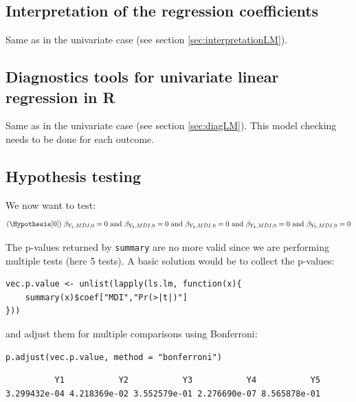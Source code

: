 \documentclass{article}
\newcommand\Rlogo{\textbf{\textsf{R}}}
\begin{document}
\subsection{Interpretation of the regression coefficients}
\label{sec:org3746056}

Same as in the univariate case (see section \ref{sec:interpretationLM}).

\subsection{Diagnostics tools for univariate linear regression in \Rlogo{}}
\label{sec:org3819252}

Same as in the univariate case (see section \ref{sec:diagLM}). This model
checking needs to be done for each outcome.

\subsection{Hypothesis testing}
\label{sec:org22df8a0}

We now want to test:
\begin{align*}
(\Hypothesis[0]) \; \beta_{Y_1, MDI, 0} = 0
 \text{ and } \beta_{Y_2, MDI, 0} = 0
 \text{ and } \beta_{Y_3, MDI, 0} = 0
 \text{ and } \beta_{Y_4, MDI, 0} = 0
 \text{ and } \beta_{Y_5, MDI, 0} = 0
\end{align*}

The p-values returned by \texttt{summary} are no more valid since we are
performing multiple tests (here 5 tests). A basic solution would be to
collect the p-values:
\lstset{language=r,label= ,caption= ,captionpos=b,numbers=none}
\begin{lstlisting}
vec.p.value <- unlist(lapply(ls.lm, function(x){
	summary(x)$coef["MDI","Pr(>|t|)"]
}))
\end{lstlisting}

\clearpage

and adjust them for multiple comparisons using Bonferroni:
\lstset{language=r,label= ,caption= ,captionpos=b,numbers=none}
\begin{lstlisting}
p.adjust(vec.p.value, method = "bonferroni")
\end{lstlisting}

\begin{verbatim}
          Y1           Y2           Y3           Y4           Y5 
3.299432e-04 4.218369e-02 3.552579e-01 2.276690e-07 8.565878e-01
\end{verbatim}
\end{document}
